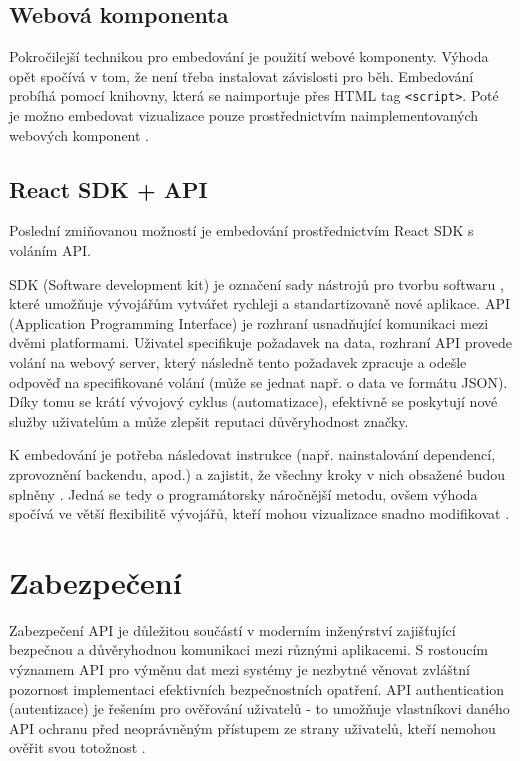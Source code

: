 \documentclass[czech, bc, kiv, he, iso690numb]{fasthesis}
\begin{document}
\subsection{Webová komponenta}
Pokročilejší technikou pro embedování je použití webové komponenty. Výhoda opět spočívá v tom, že není třeba instalovat závislosti pro běh. Embedování probíhá pomocí knihovny, která se naimportuje přes HTML tag \texttt{<script>}. Poté je možno embedovat vizualizace pouze prostřednictvím naimplementovaných webových komponent \cite{webComp}.

\subsection{React SDK + API}
Poslední zmiňovanou možností je embedování prostřednictvím React SDK s voláním API. 

SDK (Software development kit) je označení sady nástrojů pro tvorbu softwaru \cite{SDKvsAPI}, které umožňuje vývojářům vytvářet rychleji a standartizovaně nové aplikace. API 
(Application Programming Interface) je rozhraní usnadňující komunikaci mezi dvěmi platformami. Uživatel specifikuje požadavek na data, rozhraní API provede volání na webový server, který
následně tento požadavek zpracuje a odešle odpověď na specifikované volání (může se jednat např. o data ve formátu JSON). Díky tomu se krátí vývojový cyklus (automatizace), efektivně 
se poskytují nové služby uživatelům a může zlepšit reputaci důvěryhodnost značky.

K embedování je potřeba následovat instrukce (např. nainstalování dependencí, zprovoznění backendu, apod.) a zajistit, že všechny kroky v nich obsažené budou splněny \cite{reactSDKComp}. Jedná se tedy o programátorsky náročnější metodu, ovšem výhoda spočívá ve větší flexibilitě vývojářů, kteří mohou vizualizace snadno modifikovat \cite{goodDataEmbedded}.

%
%
\section{Zabezpečení}
Zabezpečení API je důležitou součástí v moderním inženýrství zajišťující bezpečnou a důvěryhodnou komunikaci mezi různými aplikacemi. S rostoucím významem API pro výměnu dat mezi
systémy je nezbytné věnovat zvláštní pozornost implementaci efektivních bezpečnostních opatření. API authentication (autentizace) je řešením pro ověřování uživatelů - to umožňuje
vlastníkovi daného API ochranu před neoprávněným přístupem ze strany uživatelů, kteří nemohou ověřit svou totožnost \cite{whatIsAPI}.
\end{document}
